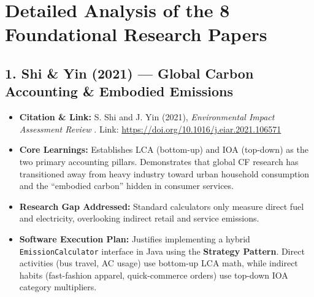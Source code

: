 \documentclass[12pt, a4paper]{article}
\begin{document}
\section{Detailed Analysis of the 8 Foundational Research Papers}

\subsection{1. Shi \& Yin (2021) --- Global Carbon Accounting \& Embodied Emissions}
\begin{itemize}[leftmargin=*]
    \item \textbf{Citation \& Link:} S. Shi and J. Yin (2021), \textit{Environmental Impact Assessment Review} \cite{shi2021global}. Link: \href{https://doi.org/10.1016/j.eiar.2021.106571}{https://doi.org/10.1016/j.eiar.2021.106571}
    \item \textbf{Core Learnings:} Establishes LCA (bottom-up) and IOA (top-down) as the two primary accounting pillars. Demonstrates that global CF research has transitioned away from heavy industry toward urban household consumption and the ``embodied carbon'' hidden in consumer services.
    \item \textbf{Research Gap Addressed:} Standard calculators only measure direct fuel and electricity, overlooking indirect retail and service emissions.
    \item \textbf{Software Execution Plan:} Justifies implementing a hybrid \texttt{EmissionCalculator} interface in Java using the \textbf{Strategy Pattern}. Direct activities (bus travel, AC usage) use bottom-up LCA math, while indirect habits (fast-fashion apparel, quick-commerce orders) use top-down IOA category multipliers.
\end{itemize}
\end{document}
